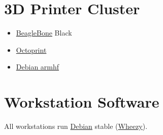 \section{3D Printer Cluster}
\begin{itemize}
\item \href{http://beagleboard.org/}{BeagleBone} Black
\item \href{http://octoprint.org/}{Octoprint}
\item \href{https://wiki.debian.org/ArmHardFloatPort}{Debian armhf}
\end{itemize}

\section{Workstation Software}

All workstations run \href{http://www.debian.org/}{Debian} stable (\href{https://www.debian.org/releases/wheezy/}{Wheezy}).

